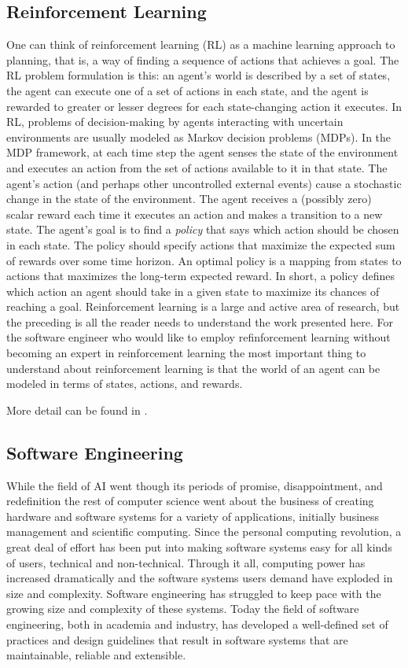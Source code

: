 \subsection{Reinforcement Learning}

One can think of reinforcement learning (RL) as a machine learning approach to planning, that is, a way of finding a sequence of actions that achieves a goal.  The RL problem formulation is this: an agent's world is described by a set of states, the agent can execute one of a set of actions in each state, and the agent is rewarded to greater or lesser degrees for each state-changing action it executes. In RL, problems of decision-making by agents interacting with uncertain environments are usually modeled as Markov decision problems (MDPs). In the MDP framework, at each time step the agent senses the state of the environment and executes an action from the set of actions available to it in that state. The agent's action (and perhaps other uncontrolled external events) cause a stochastic change in the state of the environment. The agent receives a (possibly zero) scalar reward each time it executes an action and makes a transition to a new state. The agent's goal is to find a {\it policy} that says which action should be chosen in each state.  The policy should specify actions that maximize the expected sum of rewards over some time horizon. An optimal policy is a mapping from states to actions that maximizes the long-term expected reward.  In short, a policy defines which action an agent should take in a given state to maximize its chances of reaching a goal.  Reinforcement learning is a large and active area of research, but the preceding is all the reader needs to understand the work presented here. For the software engineer who would like to employ refinforcement learning without becoming an expert in reinforcement learning the most important thing to understand about reinforcement learning is that the world of an agent can be modeled in terms of states, actions, and rewards.

More detail can be found in \cite{sutton1998reinforcement,kaelbling1996reinforcement}.

\subsection{Software Engineering}

While the field of AI went though its periods of promise, disappointment, and redefinition the rest of computer science went about the business of creating hardware and software systems for a variety of applications, initially business management and scientific computing.  Since the personal computing revolution, a great deal of effort has been put into making software systems easy for all kinds of users, technical and non-technical.  Through it all, computing power has increased dramatically and the software systems users demand have exploded in size and complexity.  Software engineering has struggled to keep pace with the growing size and complexity of these systems. Today the field of software engineering, both in academia and industry, has developed a well-defined set of practices and design guidelines that result in software systems that are maintainable, reliable and extensible.

